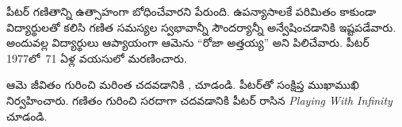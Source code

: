 \documentclass[../../../include/open-logic-section]{subfiles}
\begin{document}
పీటర్ గణితాన్ని ఉత్సాహంగా బోధించేవారని పేరుంది. ఉపన్యాసాలకే పరిమితం కాకుండా విద్యార్థులతో కలిసి గణిత సమస్యల స్వభావాన్నీ సౌందర్యాన్నీ అన్వేషించడానికి ఇష్టపడేవారు. అందువల్ల విద్యార్థులు ఆప్యాయంగా ఆమెను ``రోజా అత్తయ్య'' అని పిలిచేవారు. పీటర్ 1977లో~71 ఏళ్ల వయసులో మరణించారు.

\begin{reading}
ఆమె జీవితం గురించి మరింత చదవడానికి \citep{Oconnor2014}, \citep{Andrasfai1986} చూడండి. \citet{Tamassy1994} పీటర్‌తో సంక్షిప్త ముఖాముఖి నిర్వహించారు. గణితం గురించి సరదాగా చదవడానికి పీటర్ రాసిన \emph{Playing With Infinity} \citep{Peter2010} చూడండి.
\end{reading}
\end{document}

